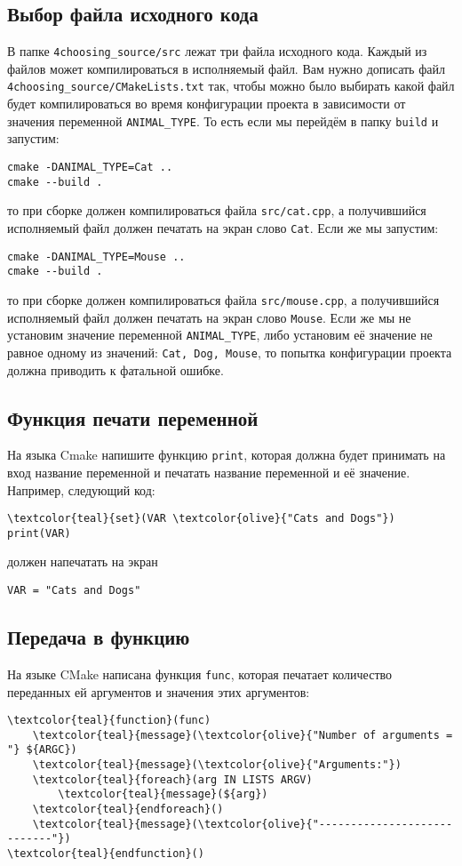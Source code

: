 \documentclass{article}
\begin{document}
\subsection{Выбор файла исходного кода}
В папке \texttt{4choosing\_source/src} лежат три файла исходного кода. Каждый из файлов может компилироваться в исполняемый файл. Вам нужно дописать файл \texttt{4choosing\_source/CMakeLists.txt} так, чтобы можно было выбирать какой файл будет компилироваться во время конфигурации проекта в зависимости от значения переменной \texttt{ANIMAL\_TYPE}. То есть если мы перейдём в папку \texttt{build} и запустим:
\begin{verbatim}
cmake -DANIMAL_TYPE=Cat ..
cmake --build .
\end{verbatim}
то при сборке должен компилироваться файла \texttt{src/cat.cpp}, а получившийся исполняемый файл должен печатать на экран слово \texttt{Cat}.
Если же мы запустим:
\begin{verbatim}
cmake -DANIMAL_TYPE=Mouse ..
cmake --build .
\end{verbatim}
то при сборке должен компилироваться файла \texttt{src/mouse.cpp}, а получившийся исполняемый файл должен печатать на экран слово \texttt{Mouse}.
Если же мы не установим значение переменной \texttt{ANIMAL\_TYPE}, либо установим её значение не равное одному из значений: \texttt{Cat, Dog, Mouse}, то попытка конфигурации проекта должна приводить к фатальной ошибке.


\subsection{Функция печати переменной}
На языка Cmake напишите функцию \texttt{print}, которая должна будет принимать на вход название переменной и печатать название переменной и её значение.
Например, следующий код:

\begin{Verbatim}[commandchars=\\\{\}]
\textcolor{teal}{set}(VAR \textcolor{olive}{"Cats and Dogs"})
print(VAR)
\end{Verbatim}
должен напечатать на экран 
\begin{verbatim}
VAR = "Cats and Dogs"
\end{verbatim}


\subsection{Передача в функцию}
На языке CMake написана функция \texttt{func}, которая печатает количество переданных ей аргументов и значения этих аргументов:
\begin{Verbatim}[commandchars=\\\{\}]
\textcolor{teal}{function}(func)
    \textcolor{teal}{message}(\textcolor{olive}{"Number of arguments = "} ${ARGC})
    \textcolor{teal}{message}(\textcolor{olive}{"Arguments:"})
    \textcolor{teal}{foreach}(arg IN LISTS ARGV)
        \textcolor{teal}{message}(${arg})
    \textcolor{teal}{endforeach}()
    \textcolor{teal}{message}(\textcolor{olive}{"----------------------------"})
\textcolor{teal}{endfunction}()
\end{Verbatim}
\end{document}
